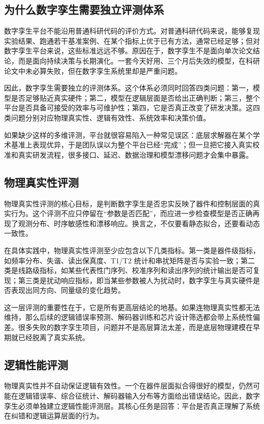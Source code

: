 \documentclass[11pt,a4paper]{article}
\begin{document}
\subsection{为什么数字孪生需要独立评测体系}

数字孪生平台不能沿用普通科研代码的评价方式。对普通科研代码来说，能够复现实验结果、跑通若干基准案例、在某个指标上优于已有方法，通常已经足够；但对数字孪生平台来说，这些标准远远不够。原因在于，数字孪生不是面向单次论文结论，而是面向持续决策与长期演化。一套今天好用、三个月后失效的模型，在科研论文中未必算失败，但在数字孪生系统里却是严重问题。

因此，数字孪生需要独立的评测体系。这个体系必须同时回答四类问题：第一，模型是否足够贴近真实硬件；第二，模型在逻辑层面是否给出正确判断；第三，整个平台是否具备可接受的效率与可维护性；第四，它是否真正改变了研发决策。这四类问题分别对应物理真实性、逻辑有效性、系统效率和决策价值。

如果缺少这样的多维评测，平台就很容易陷入一种常见误区：底层求解器在某个学术基准上表现优异，于是团队误以为整个平台已经“完成”；但一旦把它接入真实校准和真实研发流程，很多接口、延迟、数据治理和模型漂移问题才会集中暴露。

\subsection{物理真实性评测}

物理真实性评测的核心目标，是判断数字孪生是否忠实反映了器件和控制层面的真实行为。这个评测不应只停留在“参数是否匹配”，而应进一步检查模型是否正确再现了观测分布、时序敏感性和漂移响应。换言之，不仅要看静态拟合，还要看动态一致性。

在具体实践中，物理真实性评测至少应包含以下几类指标。第一类是器件级指标，如频率分布、失谐、读出保真度、T1/T2 统计和串扰矩阵是否与实验一致；第二类是线路级指标，如某些代表性门序列、校准序列和读出序列的统计输出是否可复现；第三类是扰动响应指标，即当某些参数被人为扰动时，数字孪生与真实硬件是否表现出同方向、同量级的变化趋势。

这一层评测的重要性在于，它是所有更高层结论的地基。如果连物理真实性都无法维持，那么后续的逻辑错误率预测、解码器训练和芯片设计筛选都会带上系统性偏差。很多失败的数字孪生项目，问题并不是高层算法太差，而是底层物理建模在早期就已经脱离了真实系统。

\subsection{逻辑性能评测}

物理真实性并不自动保证逻辑有效性。一个在器件层面拟合得很好的模型，仍然可能在逻辑错误率、综合征统计、解码器输入分布等方面给出错误结论。因此，数字孪生必须单独建立逻辑性能评测层。其核心任务是回答：平台是否真正理解了系统在纠错和逻辑运算层面的行为。
\end{document}
